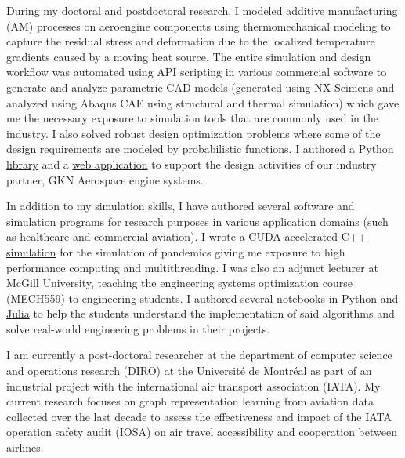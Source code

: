 \documentclass[12pt]{article} %
\begin{document}
During my doctoral and postdoctoral research, I modeled additive manufacturing (AM) processes on aeroengine components using thermomechanical modeling to capture the residual stress and deformation due to the localized temperature gradients caused by a moving heat source. The entire simulation and design workflow was automated using API scripting in various commercial software to generate and analyze parametric CAD models (generated using NX Seimens and analyzed using Abaqus CAE using structural and thermal simulation) which gave me the necessary exposure to simulation tools that are commonly used in the industry. I also solved robust design optimization problems where some of the design requirements are modeled by probabilistic functions. I authored a \href{https://sed-group.github.io/mvmlib/index.html}{Python library} and a \href{https://github.com/khbalhandawi/scale_AM_webapp}{web application} to support the design activities of our industry partner, GKN Aerospace engine systems.

\medskip %

In addition to my simulation skills, I have authored several software and simulation programs for research purposes in various application domains (such as healthcare and commercial aviation). I wrote a \href{https://github.com/khbalhandawi/COVID_SIM_GPU}{CUDA accelerated C++ simulation} for the simulation of pandemics giving me exposure to high performance computing and multithreading. I was also an adjunct lecturer at McGill University, teaching the engineering systems optimization course (MECH559) to engineering students. I authored several \href{https://github.com/khbalhandawi/MECH559_notebooks}{notebooks in Python and Julia} to help the students understand the implementation of said algorithms and solve real-world engineering problems in their projects.

\medskip %

I am currently a post-doctoral researcher at the department of computer science and operations research (DIRO) at the Universit\'{e} de Montr\'{e}al as part of an industrial project with the international air transport association (IATA). My current research focuses on graph representation learning from aviation data collected over the last decade to assess the effectiveness and impact of the IATA operation safety audit (IOSA) on air travel accessibility and cooperation between airlines. 

\medskip %
\end{document}
